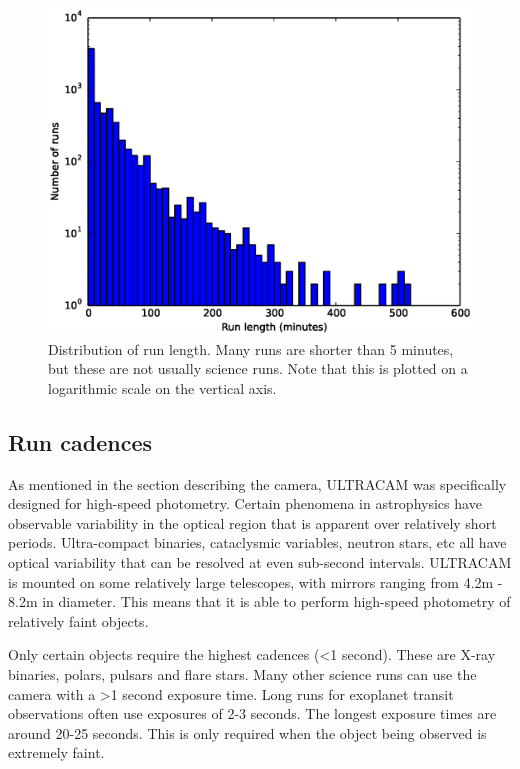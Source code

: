 \begin{figure}
  \centering
  \includegraphics[width=120mm]{images/hist0-600_log.eps}
  \caption{Distribution of run length. Many runs are shorter than 5 minutes, but these are not usually science runs. Note that this is plotted on a logarithmic scale on the vertical axis. }
  \label{fig:histogram0-600}
\end{figure}

\subsection{Run cadences}
As mentioned in the section describing the camera, ULTRACAM was specifically designed for high-speed photometry. Certain phenomena in astrophysics have observable variability in the optical region that is apparent over relatively short periods. Ultra-compact binaries, cataclysmic variables, neutron stars, etc all have optical variability that can be resolved at even sub-second intervals. ULTRACAM is mounted on some relatively large telescopes, with mirrors ranging from 4.2m - 8.2m in diameter. This means that it is able to perform high-speed photometry of relatively faint objects. 

Only certain objects require the highest cadences (\textless 1 second). These are X-ray binaries, polars, pulsars and flare stars. Many other science runs can use the camera with a \textgreater 1 second exposure time. Long runs for exoplanet transit observations often use exposures of 2-3 seconds. The longest exposure times are around 20-25 seconds. This is only required when the object being observed is extremely faint.  

